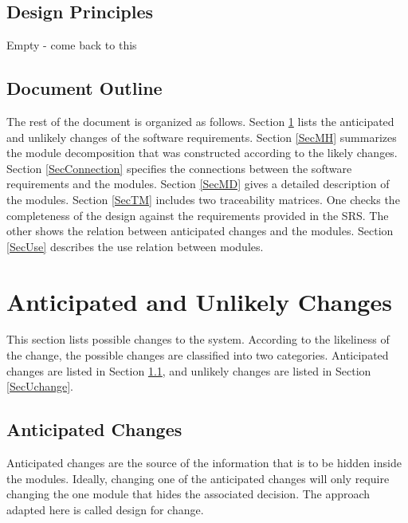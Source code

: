 \documentclass[12pt, titlepage]{article}
\begin{document}
\subsection{Design Principles}
Empty - come back to this

\subsection{Document Outline}
The rest of the document is organized as follows. Section
\ref{SecChange} lists the anticipated and unlikely changes of the software
requirements. Section \ref{SecMH} summarizes the module decomposition that
was constructed according to the likely changes. Section \ref{SecConnection}
specifies the connections between the software requirements and the
modules. Section \ref{SecMD} gives a detailed description of the
modules. Section \ref{SecTM} includes two traceability matrices. One checks
the completeness of the design against the requirements provided in the SRS. The
other shows the relation between anticipated changes and the modules. Section
\ref{SecUse} describes the use relation between modules.

\section{Anticipated and Unlikely Changes} \label{SecChange}

This section lists possible changes to the system. According to the likeliness
of the change, the possible changes are classified into two
categories. Anticipated changes are listed in Section \ref{SecAchange}, and
unlikely changes are listed in Section \ref{SecUchange}.

\subsection{Anticipated Changes} \label{SecAchange}

Anticipated changes are the source of the information that is to be hidden
inside the modules. Ideally, changing one of the anticipated changes will only
require changing the one module that hides the associated decision. The approach
adapted here is called design for
change.
\end{document}
